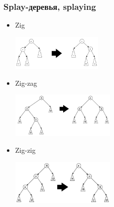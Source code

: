 \documentclass[xetex,mathserif,serif]{beamer}
\begin{document}
    \begin{frame}
        \frametitle{Splay-деревья, splaying}
        \begin{itemize}
            \item Zig
            \begin{center}
                \includegraphics[width=0.35\textwidth]{zig.png}
            \end{center}
            \item Zig-zag
            \begin{center}
                \includegraphics[width=0.4\textwidth]{zig-zag.png}
            \end{center}
            \item Zig-zig
            \begin{center}
                \includegraphics[width=0.4\textwidth]{zig-zig.png}
            \end{center}
        \end{itemize}
    \end{frame}
\end{document}
